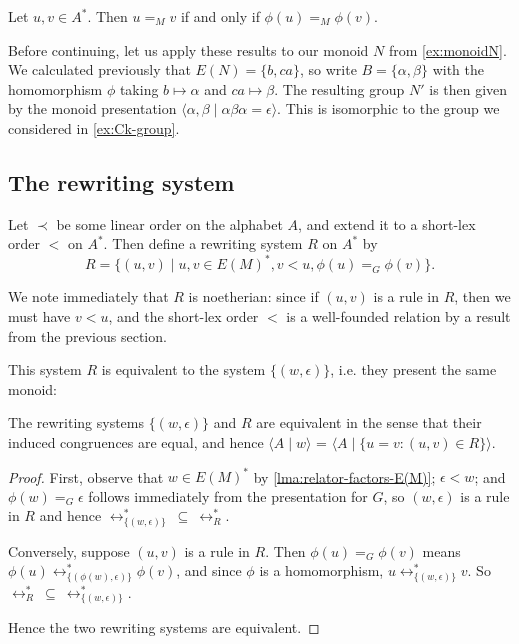 \documentclass[noindex,noinsetproof,12pt]{lmaths}
\begin{document}
\begin{prop}
	Let $u, v \in A^*$. Then $u =_M v$ if and only if $\phi(u) =_M \phi(v)$. \incomplete
\end{prop}

Before continuing, let us apply these results to our monoid $N$ from \cref{ex:monoidN}. We calculated previously that $E(N) = \{b, ca\}$, so write $B = \{\alpha, \beta\}$ with the homomorphism $\phi$ taking $b \mapsto \alpha$ and $ca \mapsto \beta$. The resulting group $N'$ is then given by the monoid presentation $\langle \alpha, \beta \mid \alpha\beta\alpha = \epsilon \rangle$. This is isomorphic to the group we considered in \cref{ex:Ck-group}.

\subsection{The rewriting system}

Let $\prec$ be some linear order on the alphabet $A$, and extend it to a short-lex order $<$ on $A^*$. Then define a rewriting system $R$ on $A^*$ by
	\[ R = \{ (u, v) \mid u, v \in E(M)^*, v < u, \phi(u) =_G \phi(v) \}. \]

We note immediately that $R$ is noetherian: since if $(u, v)$ is a rule in $R$, then we must have $v < u$, and the short-lex order $<$ is a well-founded relation by a result from the previous section.

This system $R$ is equivalent to the system $\{(w, \epsilon)\}$, i.e. they present the same monoid:
\begin{lemma} \label{lma:R-equivalent-to-pres}
	The rewriting systems $\{(w, \epsilon)\}$ and $R$ are equivalent in the sense that their induced congruences  are equal, and hence $\langle A \mid w \rangle$ = $\langle A \mid \{u = v : (u, v) \in R\}\rangle$.
\end{lemma}
\begin{proof}
	First, observe that $w \in E(M)^*$ by \cref{lma:relator-factors-E(M)}; $\epsilon < w$; and $\phi(w) =_G \epsilon$ follows immediately from the presentation for $G$, so $(w, \epsilon)$ is a rule in $R$ and hence $\leftrightarrow^*_{\{(w,\epsilon)\}}\ \subseteq\ \leftrightarrow^*_R$.

Conversely, suppose $(u, v)$ is a rule in $R$. Then $\phi(u) =_G \phi(v)$ means $\phi(u) \leftrightarrow^*_{\{(\phi(w), \epsilon)\}} \phi(v)$, and since $\phi$ is a homomorphism, $u \leftrightarrow^*_{\{(w, \epsilon)\}} v$. So $\leftrightarrow^*_R\ \subseteq\ \leftrightarrow^*_{\{(w,\epsilon)\}}$.

Hence the two rewriting systems are equivalent.
\end{proof}
\end{document}
